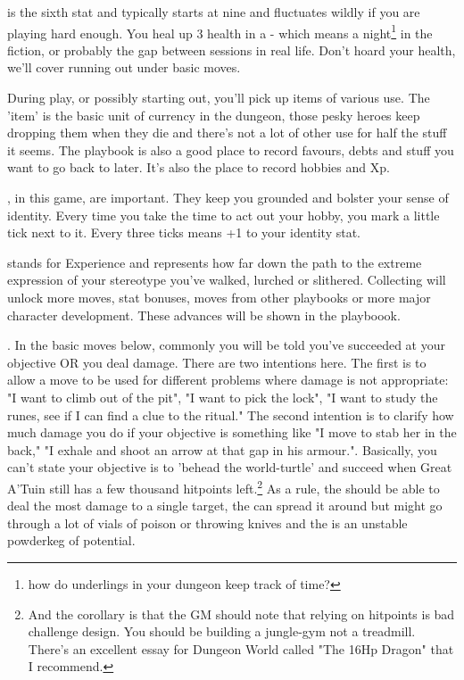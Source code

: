 \documentclass{tufte-book}
\begin{document}


 is the sixth stat and typically starts at nine and fluctuates wildly if you are playing hard enough. You heal up 3 health in a  - which means a night\footnote{how do underlings in your dungeon keep track of time?} in the fiction, or probably the gap between sessions in real life. Don't hoard your health, we'll cover running out under basic moves.

During play, or possibly starting out, you'll pick up items of various use. The 'item' is the basic unit of currency in the dungeon, those pesky heroes keep dropping them when they die and there's not a lot of other use for half the stuff it seems. The playbook is also a good place to record favours, debts and stuff you want to go back to later. It's also the place to record hobbies and Xp. 

, in this game, are important. They keep you grounded and bolster your sense of identity. Every time you take the time to act out your hobby, you mark a little tick next to it. Every three ticks means +1 to your identity stat.  

 stands for Experience and represents  how far down the path to the extreme expression of your stereotype you've walked, lurched or slithered. Collecting  will unlock more moves, stat bonuses, moves from other playbooks or more major character development. These advances will be shown in the playboook.

. In the basic moves below, commonly you will be told you've succeeded at your objective OR you deal damage. There are two intentions here. The first is to allow a move to be used for different problems where damage is not appropriate: "I want to climb out of the pit", "I want to pick the lock", "I want to study the runes, see if I can find a clue to the ritual." The second intention is to clarify how much damage you do if your objective is something like "I move to stab her in the back," "I exhale and shoot an arrow at that gap in his armour.". Basically, you can't state your objective is to 'behead the world-turtle' and succeed when Great A'Tuin still has a few thousand hitpoints left.\footnote{And the corollary is that the GM should note that relying on hitpoints is bad challenge design. You should be building a jungle-gym not a treadmill. There's an excellent essay for Dungeon World called "The 16Hp Dragon" that I recommend.} As a rule, the  should be able to deal the most damage to a single target, the  can spread it around but might go through a lot of vials of poison or throwing knives and the  is an unstable powderkeg of potential.
\bigskip
\end{document}
